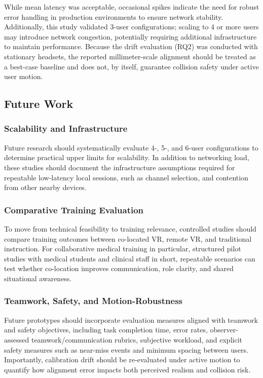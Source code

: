While mean latency was acceptable, occasional spikes indicate the need for robust error handling in production environments to ensure network stability. Additionally, this study validated 3-user configurations; scaling to 4 or more users may introduce network congestion, potentially requiring additional infrastructure to maintain performance.
Because the drift evaluation (RQ2) was conducted with stationary headsets, the reported millimeter-scale alignment should be treated as a best-case baseline and does not, by itself, guarantee collision safety under active user motion.


\subsection{Future Work}

\subsubsection{Scalability and Infrastructure}
Future research should systematically evaluate 4-, 5-, and 6-user configurations to determine practical upper limits for scalability. In addition to networking load, these studies should document the infrastructure assumptions required for repeatable low-latency local sessions, such as channel selection, and contention from other nearby devices.

\subsubsection{Comparative Training Evaluation}
To move from technical feasibility to training relevance, controlled studies should compare training outcomes between co-located VR, remote VR, and traditional instruction. For collaborative medical training in particular, structured pilot studies with medical students and clinical staff in short, repeatable scenarios can test whether co-location improves communication, role clarity, and shared situational awareness.

\subsubsection{Teamwork, Safety, and Motion-Robustness}
Future prototypes should incorporate evaluation measures aligned with teamwork and safety objectives, including task completion time, error rates, observer-assessed teamwork/communication rubrics, subjective workload, and explicit safety measures such as near-miss events and minimum spacing between users. Importantly, calibration drift should be re-evaluated under active motion to quantify how alignment error impacts both perceived realism and collision risk.


